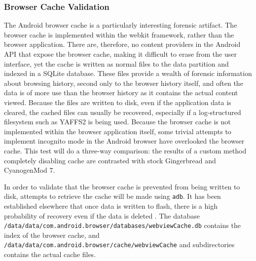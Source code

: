 \subsubsection{Browser Cache Validation}
The Android browser cache is a particularly interesting forensic artifact.  The browser cache is implemented within the webkit
framework, rather than the browser application.  There are, therefore, no content providers in the Android API that expose the
browser cache, making it difficult to erase from the user interface, yet the cache is written as normal files to the data partition
and indexed in a SQLite database.  These files provide a wealth of forensic information about browsing history, second only to the
browser history itself, and often the data is of more use than the browser history as it contains the actual content viewed.
Because the files are written to disk, even if the application data is cleared, the cached files can usually be recovered,
especially if a log-structured filesystem such as YAFFS2 is being used.  Because the browser cache is not implemented within the
browser application itself, some trivial attempts to implement incognito mode in the Android browser have overlooked the browser
cache.  This test will do a three-way comparison: the results of a custom method completely disabling cache are contrasted with
stock Gingerbread and CyanogenMod 7.

In order to validate that the browser cache is prevented from being written to disk, attempts to retrieve the cache will be made using
\texttt{adb}.  It has been established elsewhere that once data is written to flash, there is a high probability of recovery even if
the data is deleted \cite{naval}. The database \texttt{/data/data/com.android.browser/databases/webviewCache.db} contains the index of the
browser cache, and \texttt{/data/data/com.android.browser/cache/webviewCache} and subdirectories contains the actual cache files. 

